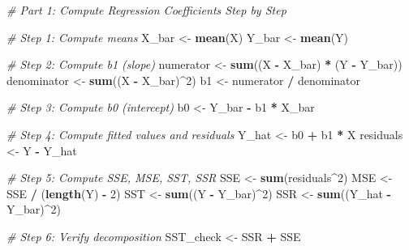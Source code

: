\documentclass[
]{article}
\newenvironment{Shaded}{\begin{snugshade}}{\end{snugshade}}
\newcommand{\CommentTok}[1]{\textcolor[rgb]{0.56,0.35,0.01}{\textit{#1}}}
\newcommand{\DecValTok}[1]{\textcolor[rgb]{0.00,0.00,0.81}{#1}}
\newcommand{\FunctionTok}[1]{\textcolor[rgb]{0.13,0.29,0.53}{\textbf{#1}}}
\newcommand{\NormalTok}[1]{#1}
\newcommand{\OtherTok}[1]{\textcolor[rgb]{0.56,0.35,0.01}{#1}}
\newcommand{\SpecialCharTok}[1]{\textcolor[rgb]{0.81,0.36,0.00}{\textbf{#1}}}
\begin{document}
\begin{Shaded}
\begin{Highlighting}[]
\CommentTok{\# Part 1: Compute Regression Coefficients Step by Step}

\CommentTok{\# Step 1: Compute means}
\NormalTok{X\_bar }\OtherTok{\textless{}{-}} \FunctionTok{mean}\NormalTok{(X)}
\NormalTok{Y\_bar }\OtherTok{\textless{}{-}} \FunctionTok{mean}\NormalTok{(Y)}


\CommentTok{\# Step 2: Compute b1 (slope)}
\NormalTok{numerator }\OtherTok{\textless{}{-}} \FunctionTok{sum}\NormalTok{((X }\SpecialCharTok{{-}}\NormalTok{ X\_bar) }\SpecialCharTok{*}\NormalTok{ (Y }\SpecialCharTok{{-}}\NormalTok{ Y\_bar))}
\NormalTok{denominator }\OtherTok{\textless{}{-}} \FunctionTok{sum}\NormalTok{((X }\SpecialCharTok{{-}}\NormalTok{ X\_bar)}\SpecialCharTok{\^{}}\DecValTok{2}\NormalTok{)}
\NormalTok{b1 }\OtherTok{\textless{}{-}}\NormalTok{ numerator }\SpecialCharTok{/}\NormalTok{ denominator}

\CommentTok{\# Step 3: Compute b0 (intercept)}
\NormalTok{b0 }\OtherTok{\textless{}{-}}\NormalTok{ Y\_bar }\SpecialCharTok{{-}}\NormalTok{ b1 }\SpecialCharTok{*}\NormalTok{ X\_bar}


\CommentTok{\# Step 4: Compute fitted values and residuals}
\NormalTok{Y\_hat }\OtherTok{\textless{}{-}}\NormalTok{ b0 }\SpecialCharTok{+}\NormalTok{ b1 }\SpecialCharTok{*}\NormalTok{ X}
\NormalTok{residuals }\OtherTok{\textless{}{-}}\NormalTok{ Y }\SpecialCharTok{{-}}\NormalTok{ Y\_hat}


\CommentTok{\# Step 5: Compute SSE, MSE, SST, SSR}
\NormalTok{SSE }\OtherTok{\textless{}{-}} \FunctionTok{sum}\NormalTok{(residuals}\SpecialCharTok{\^{}}\DecValTok{2}\NormalTok{)}
\NormalTok{MSE }\OtherTok{\textless{}{-}}\NormalTok{ SSE }\SpecialCharTok{/}\NormalTok{ (}\FunctionTok{length}\NormalTok{(Y) }\SpecialCharTok{{-}} \DecValTok{2}\NormalTok{)}
\NormalTok{SST }\OtherTok{\textless{}{-}} \FunctionTok{sum}\NormalTok{((Y }\SpecialCharTok{{-}}\NormalTok{ Y\_bar)}\SpecialCharTok{\^{}}\DecValTok{2}\NormalTok{)}
\NormalTok{SSR }\OtherTok{\textless{}{-}} \FunctionTok{sum}\NormalTok{((Y\_hat }\SpecialCharTok{{-}}\NormalTok{ Y\_bar)}\SpecialCharTok{\^{}}\DecValTok{2}\NormalTok{)}

\CommentTok{\# Step 6: Verify decomposition}
\NormalTok{SST\_check }\OtherTok{\textless{}{-}}\NormalTok{ SSR }\SpecialCharTok{+}\NormalTok{ SSE}
\end{Highlighting}
\end{Shaded}
\end{document}
